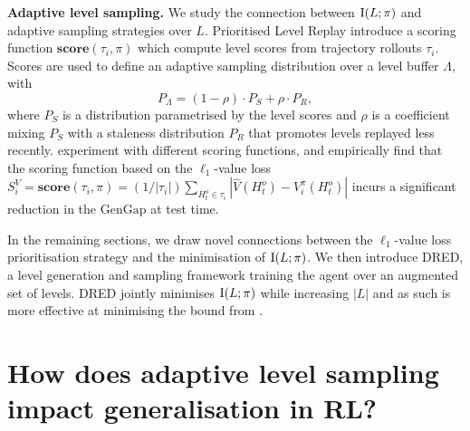 \textbf{Adaptive level sampling.} We study the connection between $\text{I}(L;\pi)$ and adaptive sampling strategies over $L$. Prioritised Level Replay \citep[PLR,][]{PLR} introduce a scoring function $\textbf{score}(\tau_i, \pi)$ which compute level scores from trajectory rollouts $\tau_i$. Scores are used to define an adaptive sampling distribution over a level buffer $\Lambda$, with
\begin{equation}\label{c3:eq:plr_buffer_dist}
    P_\Lambda = (1 - \rho) \cdot P_S + \rho \cdot P_R,
\end{equation}
where $P_S$ is a distribution parametrised by the level scores and $\rho$ is a coefficient mixing $P_S$ with a staleness distribution $P_R$ that promotes levels replayed less recently. \citet{PLR} experiment with different scoring functions, and empirically find that the scoring function based on the $\ell_1$-value loss $S^V_i = \textbf{score}(\tau_i, \pi) = (1 / |\tau_i|) \sum_{H_t^o\in\tau_i} |\hat{V} (H_t^o) - V^\pi_i (H_t^o) |$ incurs a significant reduction in the $\text{GenGap}$ at test time. 

In the remaining sections, we draw novel connections between the $\ell_1$-value loss prioritisation strategy and the minimisation of $\text{I}(L;\pi)$. We then introduce DRED, a level generation and sampling framework training the agent over an augmented set of levels. DRED jointly minimises $\text{I}(L;\pi)$ while increasing $|L|$ and as such is more effective at minimising the bound from .
\section{How does adaptive level sampling impact generalisation in RL?} \label{c3:sec:procgen}






